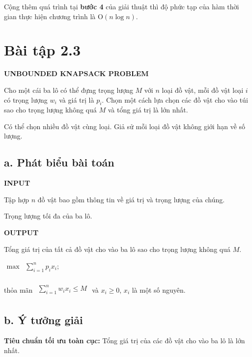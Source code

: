 \documentclass[12pt, a4paper, fleqn]{article}
\begin{document}
	Cộng thêm quá trình tại \textbf{bước 4} của giải thuật thì độ phức tạp của hàm thời gian thực hiện chương trình là O$(n \log n)$.
	
	\clearpage
	
	\section*{Bài tập 2.3}
	
	
	\textbf{UNBOUNDED KNAPSACK PROBLEM}
	
	Cho một cái ba lô có thể đựng trọng lượng $M$ với $n$ loại đồ vật, mỗi đồ vật loại $i$ có trọng lượng $w_i$ và giá trị là $p_i$. Chọn một cách lựa chọn các đồ vật	cho vào túi sao cho trọng lượng không quá $M$ và tổng giá trị là lớn nhất.
	
	Có thể chọn nhiều đồ vật cùng loại. Giả sử mỗi loại đồ vật không giới hạn về số lượng.
	
	\subsection*{a. Phát biểu bài toán}
	
	\textbf{INPUT}

	Tập hợp $n$ đồ vật bao gồm thông tin về giá trị và trọng lượng của chúng.

	Trọng lượng tối đa của ba lô.

	\textbf{OUTPUT}

	Tổng giá trị của tất cả đồ vật cho vào ba lô sao cho trọng lượng không quá $M$.
	
	${\displaystyle
		{\begin{aligned}
			\max &\sum _{ i = 1}^{n}p_i x_i;\\
			\end{aligned}}}$
	
	thỏa mãn ${\displaystyle
		{\begin{aligned}
			\sum _{ i = 1}^{n}w_i x_i \leq M\\
			\end{aligned}}}$ và $x_i \geq 0$, $x_i$ là một số nguyên.
	
	\subsection*{b. Ý tưởng giải}
	
	\textbf{Tiêu chuẩn tối ưu toàn cục:} Tổng giá trị của các đồ vật cho vào ba lô là lớn nhất.
\end{document}
